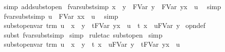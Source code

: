 \begin{isabellebody}
%
\isadelimproof
%
\endisadelimproof
%
\isatagproof
{}\isamarkupfalse%
\ {\isacharparenleft}simp\ add{\isacharcolon}subst{\isacharunderscore}open{\isacharparenright}%
\endisatagproof
{\isafoldproof}%
%
\isadelimproof
\isanewline
%
\endisadelimproof
\isanewline
{}\isamarkupfalse%
\ fvar{\isacharunderscore}subst{\isacharunderscore}simp{\isacharcolon}\ {\isachardoublequoteopen}x\ {\isasymnoteq}\ y\ {\isasymLongrightarrow}\ FVar\ y\ {\isacharequal}\ FVar\ y{\isacharbrackleft}x\ {\isacharcolon}{\isacharcolon}{\isacharequal}\ u{\isacharbrackright}{\isachardoublequoteclose}\ \isanewline
%
\isadelimproof
%
\endisadelimproof
%
\isatagproof
{}\isamarkupfalse%
\ simp%
\endisatagproof
{\isafoldproof}%
%
\isadelimproof
\isanewline
%
\endisadelimproof
\isanewline
{}\isamarkupfalse%
\ fvar{\isacharunderscore}subst{\isacharunderscore}simp{}{\isacharcolon}\ {\isachardoublequoteopen}u\ {\isacharequal}\ FVar\ x{\isacharbrackleft}x\ {\isacharcolon}{\isacharcolon}{\isacharequal}\ u{\isacharbrackright}{\isachardoublequoteclose}\ \isanewline
%
\isadelimproof
%
\endisadelimproof
%
\isatagproof
{}\isamarkupfalse%
\ simp%
\endisatagproof
{\isafoldproof}%
%
\isadelimproof
\isanewline
%
\endisadelimproof
\isanewline
{}\isamarkupfalse%
\ subst{\isacharunderscore}open{\isacharunderscore}var{\isacharcolon}\ {\isachardoublequoteopen}trm\ u\ {\isasymLongrightarrow}\ x\ {\isasymnoteq}\ y\ {\isasymLongrightarrow}\ {\isacharparenleft}t{\isacharcircum}FVar\ y{\isacharparenright}{\isacharbrackleft}x\ {\isacharcolon}{\isacharcolon}{\isacharequal}\ u{\isacharbrackright}\ {\isacharequal}\ {\isacharparenleft}t\ {\isacharbrackleft}x\ {\isacharcolon}{\isacharcolon}{\isacharequal}\ u{\isacharbrackright}{\isacharparenright}{\isacharcircum}FVar\ y{\isachardoublequoteclose}\isanewline
%
\isadelimproof
%
\endisadelimproof
%
\isatagproof
{}\isamarkupfalse%
\ opn{\isacharprime}{\isacharunderscore}def\isanewline
{}\isamarkupfalse%
\ {\isacharparenleft}subst{\isacharparenleft}{}{\isacharparenright}\ fvar{\isacharunderscore}subst{\isacharunderscore}simp{\isacharparenright}\isanewline
{}\isamarkupfalse%
\ simp\isanewline
{}\isamarkupfalse%
\ {\isacharparenleft}rule{\isacharunderscore}tac\ subst{\isacharunderscore}open{\isacharparenright}\isanewline
{}\isamarkupfalse%
\ simp%
\endisatagproof
{\isafoldproof}%
%
\isadelimproof
\isanewline
%
\endisadelimproof
\isanewline
{}\isamarkupfalse%
\ subst{\isacharunderscore}open{\isacharunderscore}var{}{\isacharcolon}\ {\isachardoublequoteopen}trm\ u\ {\isasymLongrightarrow}\ x\ {\isasymnoteq}\ y\ {\isasymLongrightarrow}\ {\isacharparenleft}t\ {\isacharbrackleft}x\ {\isacharcolon}{\isacharcolon}{\isacharequal}\ u{\isacharbrackright}{\isacharparenright}{\isacharcircum}FVar\ y\ {\isacharequal}\ {\isacharparenleft}t{\isacharcircum}FVar\ y{\isacharparenright}{\isacharbrackleft}x\ {\isacharcolon}{\isacharcolon}{\isacharequal}\ u{\isacharbrackright}{\isachardoublequoteclose}\ \isanewline

\end{isabellebody}
